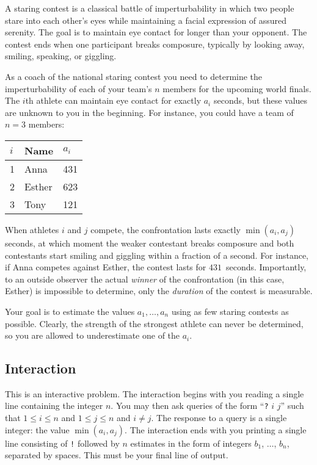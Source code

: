 

\noindent
A staring contest is a classical battle of imperturbability in which two people stare into each other's eyes while maintaining a facial expression of assured serenity.
The goal is to maintain eye contact for longer than your opponent.
The contest ends when one participant breaks composure, typically by looking away, smiling, speaking, or giggling.

As a coach of the national staring contest you need to determine the imperturbability of each of your team's $n$ members for the upcoming world finals.
The $i$th athlete can maintain eye contact for exactly $a_i$ seconds, but these values are unknown to you in the beginning.
For instance, you could have a team of $n=3$ members:

\medskip
\begin{tabular}{lll}
  $i$ & Name & $a_i$\\\hline
  1 & Anna &  431 \\
  2 & Esther & 623 \\
  3 & Tony &  121\\
\end{tabular}

\medskip
When athletes $i$ and $j$ compete, the confrontation lasts exactly $\min(a_i, a_j)$ seconds, at which moment the weaker contestant breaks composure and both contestants start smiling and giggling within a fraction of a second.
For instance, if Anna competes against Esther, the contest lasts for $431$~seconds.
Importantly, to an outside observer the actual \emph{winner} of the confrontation (in this case, Esther) is impossible to determine, only the \emph{duration} of the contest is measurable.

Your goal is to estimate the values $a_1,\ldots, a_n$ using as few staring contests as possible.
Clearly, the strength of the strongest athlete can never be determined, so you are allowed to underestimate one of the $a_i$.

\subsection*{Interaction}

This is an interactive problem.
The interaction begins with you reading a single line containing the integer $n$.
You may then ask queries of the form ``\texttt{?} $i$ $j$'' such that $1\leq i\leq n$ and $1\leq j\leq n$ and $i\neq j$.
The response to a query is a single integer: the value $\min(a_i, a_j)$.
The interaction ends with you printing a single line consisting of \texttt{!} followed by $n$ estimates in the form of integers $b_1$, $\ldots$, $b_n$, separated by spaces.
This must be your final line of output.

